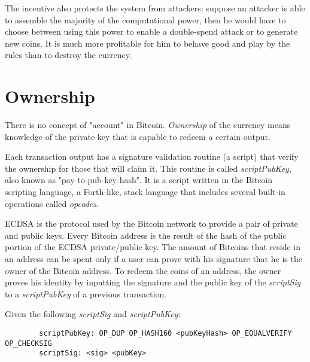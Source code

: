 		The incentive also protects the system from attackers: suppose an attacker is able to assemble the majority of the computational power, then he would have to choose between using this power to enable a double-spend attack or to generate new coins. It is much more profitable for him to behave good and play by the rules than to destroy the currency.
		
		\section{Ownership}
		
		There is no concept of "account" in Bitcoin. \textit{Ownership} of the currency means knowledge of the private key that is capable to redeem a certain output.
		
		Each transaction output has a signature validation routine (a script) that verify the ownership for those that will claim it. This routine is called \textit{scriptPubKey}, also known as "pay-to-pub-key-hash". It is a script written in the Bitcoin scripting language, a Forth-like, stack language that includes several built-in operations called \textit{opcodes}. 
		
		ECDSA is the protocol used by the Bitcoin network to provide a pair of private and public keys. Every Bitcoin address is the result of the hash of the public portion of the ECDSA private/public key. The amount of Bitcoins that reside in an address can be spent only if a user can prove with his signature that he is the owner of the Bitcoin address. To redeem the coins of an address, the owner proves his identity by inputting the signature and the public key of the \textit{scriptSig} to a \textit{scriptPubKey} of a previous transaction.
		
		\newpage
		
		Given the following \textit{scriptSig} and \textit{scriptPubKey}:
		\begin{verbatim}
		scriptPubKey: OP_DUP OP_HASH160 <pubKeyHash> OP_EQUALVERIFY OP_CHECKSIG
		scriptSig: <sig> <pubKey>
		\end{verbatim}
		
